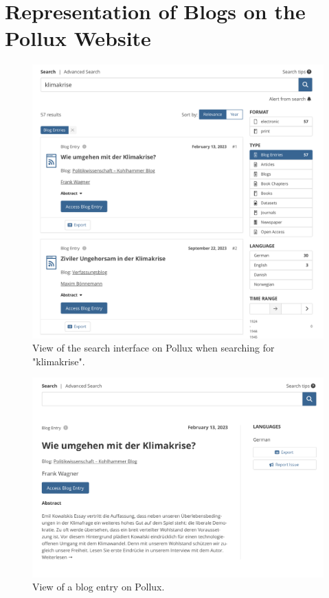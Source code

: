 \documentclass{article}
\begin{document}
\appendix
\section{Representation of Blogs on the Pollux Website}\label{appendix:website}

\begin{figure}[ht]
    \includegraphics[width=\textwidth]{figures/pollux_web_search_bar.png} %
    \caption{View of the search interface on Pollux when searching for "klimakrise".}
    \label{fig:pollux_web_search_bar}
\end{figure}

\begin{figure}[ht]
    \includegraphics[width=\textwidth]{figures/pollux_web_blog_entry.png} %
    \caption{View of a blog entry on Pollux.}
    \label{fig:pollux_web_blog_entry}
\end{figure}
\end{document}
